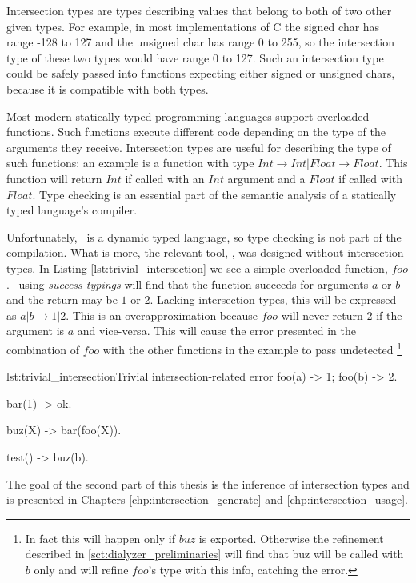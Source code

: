 Intersection types are types describing values that belong to both of
two other given types. For example, in most implementations of C the
signed char has range -128 to 127 and the unsigned char has range 0 to
255, so the intersection type of these two types would have range 0 to
127. Such an intersection type could be safely passed into functions
expecting either signed or unsigned chars, because it is compatible
with both types.

Most modern statically typed programming languages support overloaded
functions. Such functions execute different code depending on the type
of the arguments they receive. Intersection types are useful for
describing the type of such functions: an example is a function with
type $ Int \rightarrow Int | Float \rightarrow Float $. This function
will return $Int$ if called with an $Int$ argument and a $Float$ if
called with $Float$. Type checking is an essential part of the
semantic analysis of a statically typed language's compiler.

Unfortunately, \er\ is a dynamic typed language, so type checking is
not part of the compilation. What is more, the relevant tool, \dr, was
designed without intersection types. In Listing
\ref{lst:trivial_intersection} we see a simple overloaded function,
$foo$. \dr\ using \emph{success typings} will find that the function
succeeds for arguments $a$ or $b$ and the return may be $1$ or
$2$. Lacking intersection types, this will be expressed as $a | b
\rightarrow 1 | 2 $. This is an overapproximation because $foo$ will
never return 2 if the argument is $a$ and vice-versa. This will cause
the error presented in the combination of $foo$ with the other
functions in the example to pass undetected \footnote{In fact this
  will happen only if $buz$ is exported. Otherwise the refinement
  described in \ref{sct:dialyzer_preliminaries} will find that buz
  will be called with $b$ only and will refine $foo$'s type with this
  info, catching the error.}

\begin{console}{lst:trivial_intersection}{Trivial intersection-related error}
  foo(a) -> 1;
  foo(b) -> 2.

  bar(1) -> ok.

  buz(X) ->
    bar(foo(X)).

  test() ->
    buz(b).
\end{console}

The goal of the second part of this thesis is the inference of
intersection types and is presented in Chapters
\ref{chp:intersection_generate} and \ref{chp:intersection_usage}.
